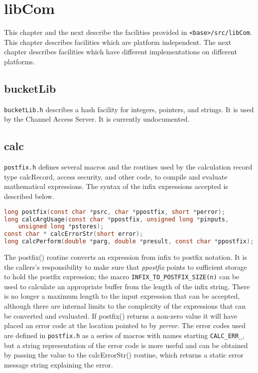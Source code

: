 \chapter{libCom}

This chapter and the next describe the facilities provided in \verb|<base>/src/libCom|.
This chapter describes facilities which are platform independent.
The next chapter describes facilities which have different implementations on different platforms.

\section{bucketLib}

\verb|bucketLib.h| describes a hash facility for integers, pointers, and strings.
It is used by the Channel Access Server.
It is currently undocumented.

\section{calc}

\verb|postfix.h| defines several macros and the routines used by the calculation record type calcRecord, access security, and other code, to compile and evaluate mathematical expressions.
The syntax of the infix expressions accepted is described below.

\begin{lstlisting}[language=C]
long postfix(const char *psrc, char *ppostfix, short *perror);
long calcArgUsage(const char *ppostfix, unsigned long *pinputs,
    unsigned long *pstores);
const char * calcErrorStr(short error);
long calcPerform(double *parg, double *presult, const char *ppostfix);
\end{lstlisting}

The postfix() routine converts an expression from infix to postfix notation.
It is the callers's responsibility to make sure that \emph{ppostfix} points to sufficient storage to hold the postfix expression;
the macro \verb|INFIX_TO_POSTFIX_SIZE(n)| can be used to calculate an appropriate buffer from the length of the infix string.
There is no longer a maximum length to the input expression that can be accepted, although there are internal limits to the complexity of the expressions that can be converted and evaluated.
If postfix() returns a non-zero value it will have placed an error code at the location pointed to by \emph{perror}.
The error codes used are defined in \verb|postfix.h| as a series of macros with names starting \verb|CALC_ERR_|, but a string representation of the error code is more useful and can be obtained by passing the value to the calcErrorStr() routine, which returns a static error message string explaining the error.

